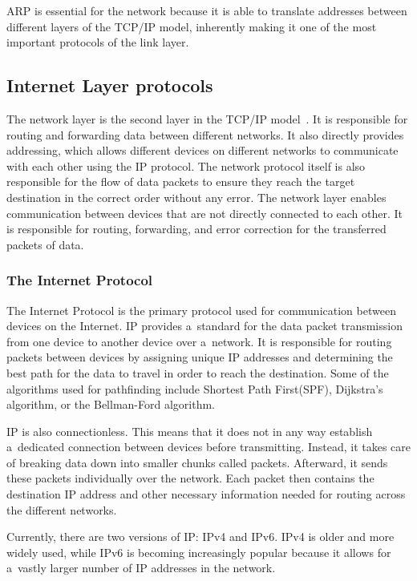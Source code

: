 \documentclass[
  printed,     %
  color,       %
  oneside,     %
  nosansbold,  %
  nocolorbold, %
  nolof,         %
  nolot,         %
]{fithesis4}
\begin{document}
\medskip 

ARP is essential for the network because it is able to translate addresses between different layers of the TCP/IP model, inherently making it one of the most important protocols of the link layer.



\subsection{Internet Layer protocols}

The network layer is the second layer in the TCP/IP model~\cite{10.5555/2584507}. It is responsible for routing and forwarding data between different networks. It also directly provides addressing, which allows different devices on different networks to communicate with each other using the IP protocol. The network protocol itself is also responsible for the flow of data packets to ensure they reach the target destination in the correct order without any error. The network layer enables communication between devices that are not directly connected to each other. It is responsible for routing, forwarding, and error correction for the transferred packets of data.

\subsubsection{The Internet Protocol}
\label{chap:ip}
The Internet Protocol is the primary protocol used for communication between devices on the Internet. IP provides a~standard for the data packet transmission from one device to another device over a~network. It is responsible for routing packets between devices by assigning unique IP addresses and determining the best path for the data to travel in order to reach the destination. Some of the algorithms used for pathfinding include Shortest Path First(SPF), Dijkstra's algorithm, or the Bellman-Ford algorithm.

IP is also connectionless. This means that it does not in any way establish a~dedicated connection between devices before transmitting. Instead, it takes care of breaking data down into smaller chunks called packets. Afterward, it sends these packets individually over the network. Each packet then contains the destination IP address and other necessary information needed for routing across the different networks.

 Currently, there are two versions of IP: IPv4 and IPv6. IPv4 is older and more widely used, while IPv6 is becoming increasingly popular because it allows for a~vastly larger number of IP addresses in the network.
\end{document}
